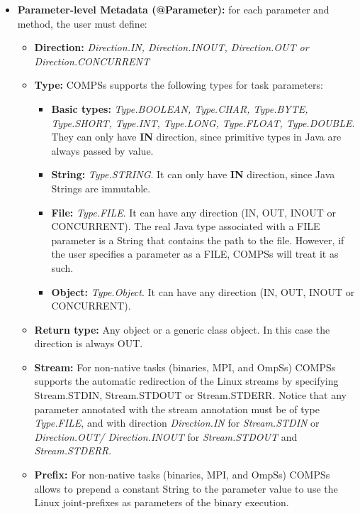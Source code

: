 \begin{itemize}
 \item \textbf{Parameter-level Metadata (@Parameter):} for each parameter and method, the user must define:
       \begin{itemize}
        \item \textbf{Direction:} \textit{Direction.IN, Direction.INOUT, Direction.OUT or Direction.CONCURRENT}
        \item \textbf{Type:} COMPSs supports the following types for task parameters:
              \begin{itemize}
               \item \textbf{Basic types:} \textit{Type.BOOLEAN, Type.CHAR, Type.BYTE, Type.SHORT, Type.INT, Type.LONG,
                     Type.FLOAT, Type.DOUBLE}. They can only have \textbf{IN} direction, since primitive types in Java are
                     always passed by value.
               \item \textbf{String:} \textit{Type.STRING}. It can only have \textbf{IN} direction, since Java Strings are immutable.
               \item \textbf{File:} \textit{Type.FILE}. It can have any direction (IN, OUT, INOUT or CONCURRENT). The real Java type associated
                     with a FILE parameter is a String that contains the path to the file. However, if the user specifies
                     a parameter as a FILE, COMPSs will treat it as such.
               \item \textbf{Object:} \textit{Type.Object}. It can have any direction (IN, OUT, INOUT or CONCURRENT).
              \end{itemize}
        \item \textbf{Return type:} Any object or a generic class object. In this case the direction is always OUT.
        \item \textbf{Stream:} For non-native tasks (binaries, MPI, and OmpSs) COMPSs supports the automatic redirection of the Linux
        streams by specifying Stream.STDIN, Stream.STDOUT or Stream.STDERR. Notice that any parameter annotated with the stream annotation
        must be of type \textit{Type.FILE}, and with direction \textit{Direction.IN} for \textit{Stream.STDIN} or \textit{Direction.OUT/
        Direction.INOUT} for \newline \textit{Stream.STDOUT} and \textit{Stream.STDERR}. 
        \item \textbf{Prefix:} For non-native tasks (binaries, MPI, and OmpSs) COMPSs allows to prepend a constant String to the parameter
        value to use the Linux joint-prefixes as parameters of the binary execution.
       \end{itemize}


\end{itemize}
